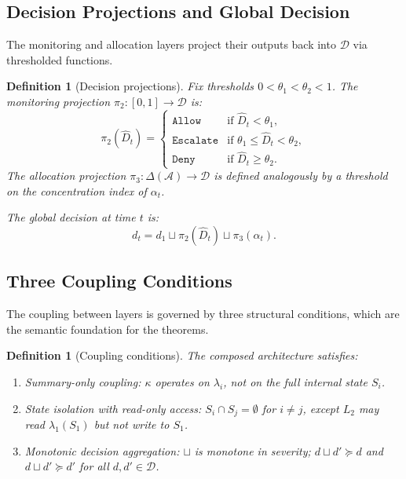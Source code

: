\documentclass[11pt]{article}
\newtheorem{definition}[theorem]{Definition}
\newcommand{\Agents}{\mathcal{A}}
\newcommand{\Dec}{\mathcal{D}}
\newcommand{\Dhat}{\widehat{D}}
\newcommand{\allow}{\texttt{Allow}}
\newcommand{\deny}{\texttt{Deny}}
\newcommand{\escalate}{\texttt{Escalate}}
\newcommand{\Layer}[1]{L_{#1}}
\newcommand{\State}[1]{S_{#1}}
\newcommand{\Sum}[1]{\lambda_{#1}}
\newcommand{\join}{\sqcup}
\begin{document}
\subsection{Decision Projections and Global Decision}

The monitoring and allocation layers project their outputs back into $\Dec$
via thresholded functions.

\begin{definition}[Decision projections]
\label{def:projections}
Fix thresholds $0 < \theta_1 < \theta_2 < 1$. The \emph{monitoring projection}
$\pi_2: [0,1] \to \Dec$ is:
\[
  \pi_2(\Dhat_t) =
  \begin{cases}
    \allow    & \text{if } \Dhat_t < \theta_1, \\
    \escalate & \text{if } \theta_1 \le \Dhat_t < \theta_2, \\
    \deny     & \text{if } \Dhat_t \ge \theta_2.
  \end{cases}
\]
The \emph{allocation projection} $\pi_3: \Delta(\Agents) \to \Dec$ is defined
analogously by a threshold on the concentration index of $\alpha_t$.

The \emph{global decision} at time $t$ is:
\[
  d_t = d_1 \join \pi_2(\Dhat_t) \join \pi_3(\alpha_t).
\]
\end{definition}

\subsection{Three Coupling Conditions}

The coupling between layers is governed by three structural conditions,
which are the semantic foundation for the theorems.

\begin{definition}[Coupling conditions]
\label{def:coupling}
The composed architecture satisfies:
\begin{enumerate}[label=(C\arabic*),noitemsep]
  \item \emph{Summary-only coupling}: $\kappa$ operates on $\Sum{i}$, not on
    the full internal state $\State{i}$.
  \item \emph{State isolation with read-only access}: $\State{i} \cap
    \State{j} = \emptyset$ for $i \neq j$, except $\Layer{2}$ may read
    $\Sum{1}(\State{1})$ but not write to $\State{1}$.
  \item \emph{Monotonic decision aggregation}: $\join$ is monotone in
    severity; $d \join d' \succeq d$ and $d \join d' \succeq d'$ for all
    $d, d' \in \Dec$.
\end{enumerate}
\end{definition}
\end{document}
